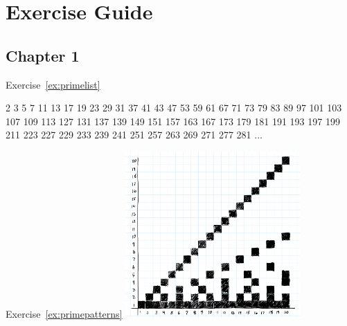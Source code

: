 

\chapter{Exercise Guide}

\section{Chapter 1} 

Exercise~\ref{ex:primelist}

2	3	5	7	11	13	17	19	23	29
31	37	41	43	47	53	59	61	67	71
73	79	83	89	97	101	103	107	109	113
127	131	137	139	149	151	157	163	167	173
179	181	191	193	197	199	211	223	227	229
233	239	241	251	257	263	269	271	277	281 ... 


Exercise~\ref{ex:primepatterns}
\includegraphics[width=0.5\textwidth]{img/factor-grid.png}
